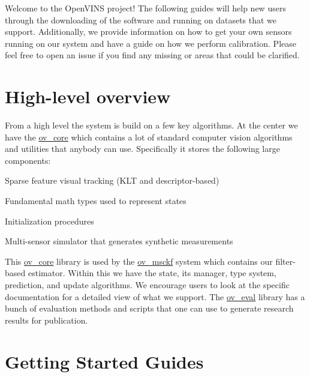 Welcome to the Open\+V\+I\+NS project! The following guides will help new users through the downloading of the software and running on datasets that we support. Additionally, we provide information on how to get your own sensors running on our system and have a guide on how we perform calibration. Please feel free to open an issue if you find any missing or areas that could be clarified.\hypertarget{getting-started_highlevel}{}\section{High-\/level overview}\label{getting-started_highlevel}
From a high level the system is build on a few key algorithms. At the center we have the \hyperlink{namespaceov__core}{ov\+\_\+core} which contains a lot of standard computer vision algorithms and utilities that anybody can use. Specifically it stores the following large components\+:


\begin{DoxyItemize}
\item Sparse feature visual tracking (K\+LT and descriptor-\/based)
\item Fundamental math types used to represent states
\item Initialization procedures
\item Multi-\/sensor simulator that generates synthetic measurements
\end{DoxyItemize}

This \hyperlink{namespaceov__core}{ov\+\_\+core} library is used by the \hyperlink{namespaceov__msckf}{ov\+\_\+msckf} system which contains our filter-\/based estimator. Within this we have the state, its manager, type system, prediction, and update algorithms. We encourage users to look at the specific documentation for a detailed view of what we support. The \hyperlink{namespaceov__eval}{ov\+\_\+eval} library has a bunch of evaluation methods and scripts that one can use to generate research results for publication.\hypertarget{getting-started_getting-started-more}{}\section{Getting Started Guides}\label{getting-started_getting-started-more}

